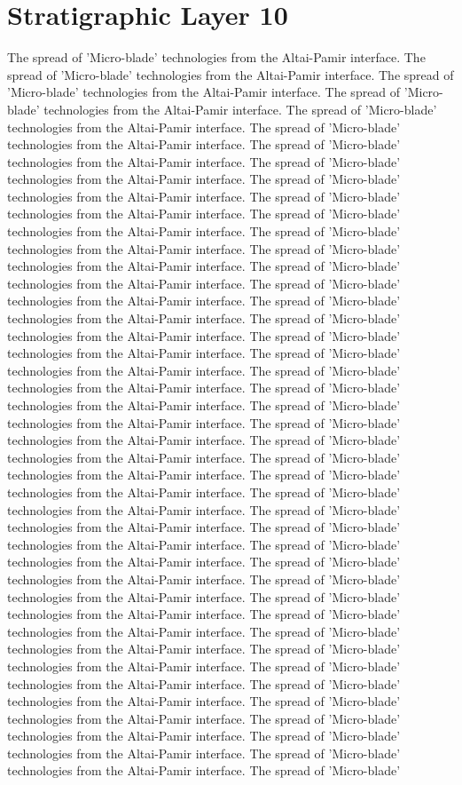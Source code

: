 \section{Stratigraphic Layer 10}
The spread of 'Micro-blade' technologies from the Altai-Pamir interface. The spread of 'Micro-blade' technologies from the Altai-Pamir interface. The spread of 'Micro-blade' technologies from the Altai-Pamir interface. The spread of 'Micro-blade' technologies from the Altai-Pamir interface. The spread of 'Micro-blade' technologies from the Altai-Pamir interface. The spread of 'Micro-blade' technologies from the Altai-Pamir interface. The spread of 'Micro-blade' technologies from the Altai-Pamir interface. The spread of 'Micro-blade' technologies from the Altai-Pamir interface. The spread of 'Micro-blade' technologies from the Altai-Pamir interface. The spread of 'Micro-blade' technologies from the Altai-Pamir interface. The spread of 'Micro-blade' technologies from the Altai-Pamir interface. The spread of 'Micro-blade' technologies from the Altai-Pamir interface. The spread of 'Micro-blade' technologies from the Altai-Pamir interface. The spread of 'Micro-blade' technologies from the Altai-Pamir interface. The spread of 'Micro-blade' technologies from the Altai-Pamir interface. The spread of 'Micro-blade' technologies from the Altai-Pamir interface. The spread of 'Micro-blade' technologies from the Altai-Pamir interface. The spread of 'Micro-blade' technologies from the Altai-Pamir interface. The spread of 'Micro-blade' technologies from the Altai-Pamir interface. The spread of 'Micro-blade' technologies from the Altai-Pamir interface. The spread of 'Micro-blade' technologies from the Altai-Pamir interface. The spread of 'Micro-blade' technologies from the Altai-Pamir interface. The spread of 'Micro-blade' technologies from the Altai-Pamir interface. The spread of 'Micro-blade' technologies from the Altai-Pamir interface. The spread of 'Micro-blade' technologies from the Altai-Pamir interface. The spread of 'Micro-blade' technologies from the Altai-Pamir interface. The spread of 'Micro-blade' technologies from the Altai-Pamir interface. The spread of 'Micro-blade' technologies from the Altai-Pamir interface. The spread of 'Micro-blade' technologies from the Altai-Pamir interface. The spread of 'Micro-blade' technologies from the Altai-Pamir interface. The spread of 'Micro-blade' technologies from the Altai-Pamir interface. The spread of 'Micro-blade' technologies from the Altai-Pamir interface. The spread of 'Micro-blade' technologies from the Altai-Pamir interface. The spread of 'Micro-blade' technologies from the Altai-Pamir interface. The spread of 'Micro-blade' technologies from the Altai-Pamir interface. The spread of 'Micro-blade' technologies from the Altai-Pamir interface. The spread of 'Micro-blade' technologies from the Altai-Pamir interface. The spread of 'Micro-blade' technologies from the Altai-Pamir interface. The spread of 'Micro-blade' technologies from the Altai-Pamir interface. The spread of 'Micro-blade' technologies from the Altai-Pamir interface. The spread of 'Micro-blade' technologies from the Altai-Pamir interface. The spread of 'Micro-blade' technologies from the Altai-Pamir interface. The spread of 'Micro-blade' 